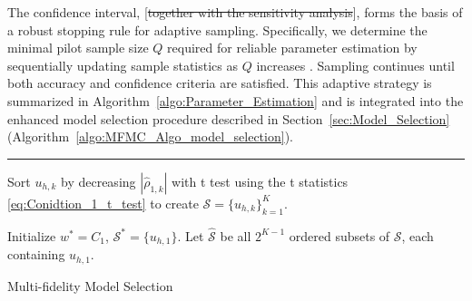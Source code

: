 The confidence interval, [\sout{together with the sensitivity analysis}], forms the basis of a robust stopping rule for adaptive sampling. Specifically, we determine the minimal pilot sample size $Q$ required for reliable parameter estimation by sequentially updating sample statistics as $Q$ increases \cite{La:2001,Wa:1947}. Sampling continues until both accuracy and confidence criteria are satisfied. This adaptive strategy is summarized in Algorithm~\ref{algo:Parameter_Estimation} and is integrated into the enhanced model selection procedure described in Section~\ref{sec:Model_Selection} (Algorithm~\ref{algo:MFMC_Algo_model_selection}).


\normalem
\begin{algorithm}[!ht]
\label{algo:MFMC_Algo_model_selection}
\DontPrintSemicolon    
   \vspace{1ex}
    
    \vspace{1ex}
    \hrule \vspace{1ex}

   
   
   Sort $u_{h, k}$ by decreasing $|\widehat \rho_{1,k}|$ with t test using the t statistics \eqref{eq:Conidtion_1_t_test} to create $\mathcal{S}=\{u_{h, k}\}_{k=1}^K$. 
   
   Initialize $w^*=C_1$, $\mathcal{S}^*=\{u_{h, 1}\}$. Let $ \mathcal{\widehat S}$ be all $2^{K-1}$ ordered subsets of $\mathcal{S}$, each containing $u_{h, 1}$. 

\caption{Multi-fidelity Model Selection}
\end{algorithm}
\ULforem


